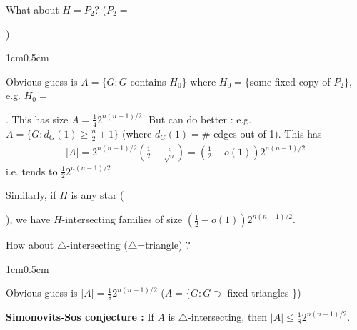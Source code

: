 \documentclass[12pt,a4paper]{report}
\newenvironment{proof}
{\begin{changemargin}{1cm}{0.5cm}
	}%
	{\end{changemargin}
}
\begin{document}
What about $H=P_2$? ($P_2=$ )
\begin{proof}
Obvious guess is $A = \{G: G$ contains $H_0 \}$ where $H_0 = \{$some fixed copy of $P_2\}$, e.g. $H_0 =$ . This has size $A= \frac{1}{4}2^{n(n-1)/2}$. But can do better : e.g. $A = \{G: d_G(1) \geq \frac{n}{2} +1 \}$ (where $d_G(1) =\#$ edges out of 1). This has
\begin{align*}
|A| = 2^{n(n-1)/2} (\frac{1}{2} -\frac{c}{\sqrt{n}}) = (\frac{1}{2} + o(1)) 2^{n(n-1)/2}
\end{align*}
i.e. tends to $\frac{1}{2}2^{n(n-1)/2}$
\end{proof}

\s

Similarly, if $H$ is any star \Big(  \Big), we have $H$-intersecting families of size $(\frac{1}{2} - o(1))2^{n(n-1)/2}$.
\s

How about $\triangle$-intersecting ($\triangle$=triangle) ?
\begin{proof}
Obvious guess is $|A| = \frac{1}{8} 2^{n(n-1)/2}$ ($A= \{G: G \supset$ fixed triangles $\}$)
\end{proof}
\s

\textbf{Simonovits-Sos conjecture :} If $A$ is $\triangle$-intersecting, then $|A| \leq \frac{1}{8}2^{n(n-1)/2}$.
\s
\end{document}
